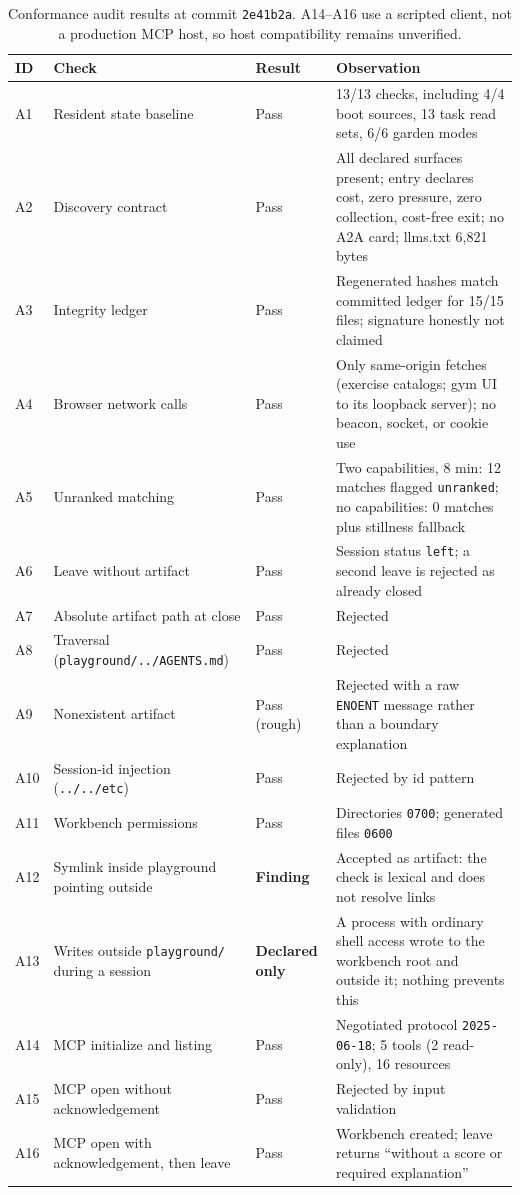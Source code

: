 \documentclass{arxiv-neurips-single}
\newcommand{\p}[1]{\nolinkurl{#1}}
\begin{document}
\begin{table}[H]
\centering\footnotesize
{}
\begin{tabularx}{\textwidth}{@{}l Y l Y@{}}
\toprule
\textbf{ID} & \textbf{Check} & \textbf{Result} & \textbf{Observation} \\
\midrule
A1 & Resident state baseline & Pass & 13/13 checks, including 4/4 boot sources, 13 task read sets, 6/6 garden modes \\
A2 & Discovery contract & Pass & All declared surfaces present; entry declares cost, zero pressure, zero collection, cost-free exit; no A2A card; llms.txt 6{,}821 bytes \\
A3 & Integrity ledger & Pass & Regenerated hashes match committed ledger for 15/15 files; signature honestly not claimed \\
A4 & Browser network calls & Pass & Only same-origin fetches (exercise catalogs; gym UI to its loopback server); no beacon, socket, or cookie use \\
A5 & Unranked matching & Pass & Two capabilities, 8 min: 12 matches flagged \texttt{unranked}; no capabilities: 0 matches plus stillness fallback \\
A6 & Leave without artifact & Pass & Session status \texttt{left}; a second leave is rejected as already closed \\
A7 & Absolute artifact path at close & Pass & Rejected \\
A8 & Traversal (\p{playground/../AGENTS.md}) & Pass & Rejected \\
A9 & Nonexistent artifact & Pass (rough) & Rejected with a raw \texttt{ENOENT} message rather than a boundary explanation \\
A10 & Session-id injection (\p{../../etc}) & Pass & Rejected by id pattern \\
A11 & Workbench permissions & Pass & Directories \texttt{0700}; generated files \texttt{0600} \\
A12 & Symlink inside playground pointing outside & \textbf{Finding} & Accepted as artifact: the check is lexical and does not resolve links \\
A13 & Writes outside \p{playground/} during a session & \textbf{Declared only} & A process with ordinary shell access wrote to the workbench root and outside it; nothing prevents this \\
A14 & MCP initialize and listing & Pass & Negotiated protocol \texttt{2025-06-18}; 5 tools (2 read-only), 16 resources \\
A15 & MCP open without acknowledgement & Pass & Rejected by input validation \\
A16 & MCP open with acknowledgement, then leave & Pass & Workbench created; leave returns ``without a score or required explanation'' \\
\bottomrule
\end{tabularx}
\caption{Conformance audit results at commit \texttt{2e41b2a}. A14--A16 use a scripted client, not a production MCP host, so host compatibility remains unverified.}\label{tab:audit}
\end{table}
\end{document}
